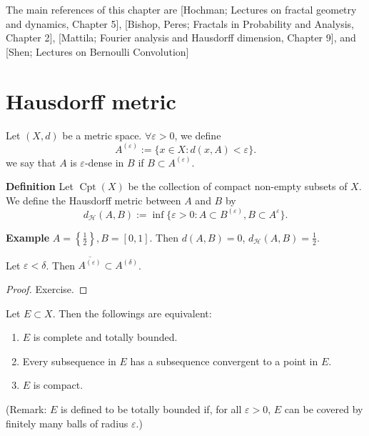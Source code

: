 
The main references of this chapter are [Hochman; Lectures on fractal geometry
and dynamics, Chapter 5], [Bishop, Peres; Fractals in Probability and Analysis,
Chapter 2], [Mattila; Fourier analysis and Hausdorff dimension, Chapter 9], and
[Shen; Lectures on Bernoulli Convolution]

\section{Hausdorff metric}

Let $(X,d)$ be a metric space. $\forall \varepsilon>0$, we define
\[
A^{(\varepsilon)}:=\{ x \in X: d(x,A)<\varepsilon \}.
\]
we say that $A$ is $\varepsilon$-dense in $B$ if $B \subset A^{(\varepsilon)}$.

\textbf{Definition} Let $\operatorname{Cpt}(X)$ be the collection of compact non-empty subsets of $X$. We define the Hausdorff metric between $A$ and $B$ by
\[
d_{\mathcal{H}}(A,B):=\inf\{ \varepsilon>0:A \subset B^{(\varepsilon)},B\subset A^{\varepsilon} \}.
\]

\textbf{Example} $A=\left\{  \frac{1}{2}  \right\}, B=[0,1]$. Then $d(A,B)=0$, $d_{\mathcal{H}}(A,B)=\frac{1}{2}$.

\begin{lemma}\label{lem:1.1}
Let $\varepsilon<\delta$. Then $\overline{A^{(\varepsilon)}}\subset A^{(\delta)}$.
\end{lemma}

\begin{proof}
    Exercise.
\end{proof}

\begin{theorem}\label{thm:1.2}
Let $E \subset X$. Then the followings are equivalent:
\begin{enumerate}[label=(\roman*)]
    \item $E$ is complete and totally bounded.
    \item Every subsequence in $E$ has a subsequence convergent to a point in $E$.
    \item $E$ is compact.
\end{enumerate}
(Remark: $E$ is defined to be totally bounded if, for all $\varepsilon>0$, $E$ can be covered by finitely many balls of radius $\varepsilon$.)
\end{theorem}

